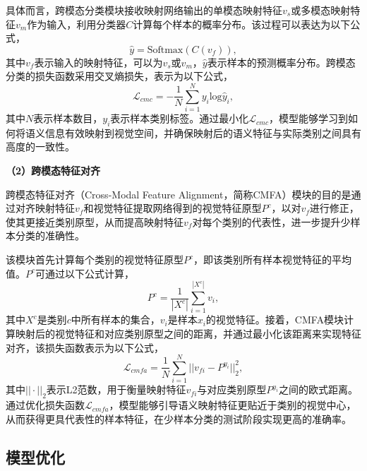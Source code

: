 具体而言，跨模态分类模块接收映射网络输出的单模态映射特征$v_s$或多模态映射特征$v_m$作为输入，利用分类器$C$计算每个样本的概率分布。该过程可以表达为以下公式，
\begin{equation}
  \label{equation4: softmax}
  \widehat{y} = \text{Softmax}(C(v_f)),
\end{equation}
其中$v_f$表示输入的映射特征，可以为$v_s$或$v_m$，$\widehat{y}$表示样本的预测概率分布。跨模态分类的损失函数采用交叉熵损失，表示为以下公式，
\begin{equation}
  \label{equation4: CMC_loss}
  \mathcal{L}_{cmc} = -\frac{1}{N}\sum_{i=1}^{N}y_i \text{log}\widehat{y}_i,
\end{equation}
其中$N$表示样本数目，$y_i$表示样本类别标签。通过最小化$\mathcal{L}_{cmc}$，模型能够学习到如何将语义信息有效映射到视觉空间，并确保映射后的语义特征与实际类别之间具有高度的一致性。

\textbf{（2）跨模态特征对齐}

跨模态特征对齐（Cross-Modal Feature Alignment，简称CMFA）模块的目的是通过对齐映射特征$v_f$和视觉特征提取网络得到的视觉特征原型$P^c$，以对$v_f$进行修正，使其更接近类别原型，从而提高映射特征$v_f$对每个类别的代表性，进一步提升少样本分类的准确性。

该模块首先计算每个类别的视觉特征原型$P^c$，即该类别所有样本视觉特征的平均值。$P^c$可通过以下公式计算，
\begin{equation}
  \label{equation4: prototype}
  {P}^{c} = \frac{1}{|X^c|} \sum_{i=1}^{|X^c|} v_i,
\end{equation}
其中$X^c$是类别$c$中所有样本的集合，$v_i$是样本$x_i$的视觉特征。接着，CMFA模块计算映射后的视觉特征和对应类别原型之间的距离，并通过最小化该距离来实现特征对齐，该损失函数表示为以下公式，
\begin{equation}
  \label{equation4: CMFA_loss}
  \mathcal{L}_{cmfa} = \frac{1}{N} \sum_{i=1}^{N} || v_{fi} - P^{y_i} ||_2^2,
\end{equation}
其中$|| \cdot ||_2$表示L2范数，用于衡量映射特征$v_{fi}$与对应类别原型$P^{y_i}$之间的欧式距离。通过优化损失函数$\mathcal{L}_{cmfa}$，模型能够引导语义映射特征更贴近于类别的视觉中心，从而获得更具代表性的样本特征，在少样本分类的测试阶段实现更高的准确率。

\subsection[\hspace{-2pt}模型优化]{{\heiti{} \hspace{-8pt}模型优化}}\label{section4: 模型优化}

